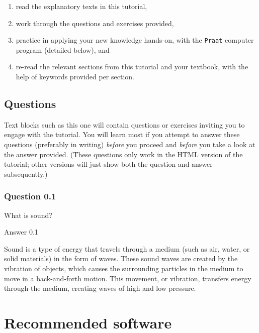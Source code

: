 \documentclass[
]{book}
\providecommand{\tightlist}{%
  \setlength{\itemsep}{0pt}\setlength{\parskip}{0pt}}
\begin{document}
\begin{enumerate}
\def\labelenumi{(\arabic{enumi})}
\tightlist
\item
  read the explanatory texts in this tutorial,
\item
  work through the questions and exercises provided,
\item
  practice in applying your new knowledge hands-on, with the \texttt{Praat} computer program (detailed below), and
\item
  re-read the relevant sections from this tutorial and your textbook, with the help of keywords provided per section.
\end{enumerate}

\label{question-intro}
\subsection*{Questions}\label{questions}

Text blocks such as this one will contain questions or exercises inviting you to engage with the tutorial. You will learn most if you attempt to answer these questions (preferably in writing) \emph{before} you proceed and \emph{before} you take a look at the answer provided. (These questions only work in the HTML version of the tutorial; other versions will just show both the question and answer subsequently.)

\subsubsection*{Question 0.1}\label{question-0.1}

What is sound?

Answer 0.1

Sound is a type of energy that travels through a medium (such as air, water, or solid materials) in the form of waves. These sound waves are created by the vibration of objects, which causes the surrounding particles in the medium to move in a back-and-forth motion. This movement, or vibration, transfers energy through the medium, creating waves of high and low pressure.

\section*{Recommended software}\label{recommended-software}
\end{document}
